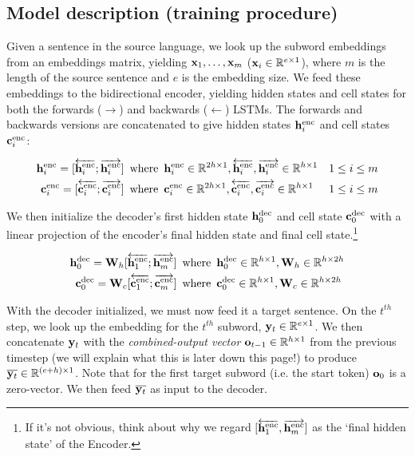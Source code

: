 \subsection*{Model description (training procedure)}
Given a sentence in the source language, we look up the subword embeddings from an embeddings matrix, yielding $\mathbf{x}_1, \dots, \mathbf{x}_m$ ($\mathbf{x}_i \in \mathbb{R}^{e \times 1}$), where $m$ is the length of the source sentence and $e$ is the embedding size. We feed these embeddings to the bidirectional encoder, yielding hidden states and cell states for both the forwards ($\rightarrow$) and backwards ($\leftarrow$) LSTMs. The forwards and backwards versions are concatenated to give hidden states $\mathbf{h}^{\text{enc}}_i$ and cell states $\mathbf{c}^{\text{enc}}_i$:

\begin{align}
    \mathbf{h}^{\text{enc}}_i = [\overleftarrow{\mathbf{h}^{\text{enc}}_{i}}; \overrightarrow{\mathbf{h}^{\text{enc}}_{i}}] \enspace &\text{where}\enspace \mathbf{h}^{\text{enc}}_i \in \mathbb{R}^{2h \times 1}, \overleftarrow{\mathbf{h}^{\text{enc}}_{i}}, \overrightarrow{\mathbf{h}^{\text{enc}}_{i}} \in \mathbb{R}^{h \times 1} &1 \le i \le m \\
    \mathbf{c}^{\text{enc}}_i = [\overleftarrow{\mathbf{c}^{\text{enc}}_{i}}; \overrightarrow{\mathbf{c}^{\text{enc}}_{i}}] \enspace &\text{where} \enspace \mathbf{c}^{\text{enc}}_i \in \mathbb{R}^{2h \times 1}, \overleftarrow{\mathbf{c}^{\text{enc}}_{i}}, \overrightarrow{\mathbf{c}^{\text{enc}}_{i}} \in \mathbb{R}^{h \times 1} &1 \le i \le m
\end{align}

We then initialize the decoder's first hidden state $\mathbf{h}^{\text{dec}}_0$ and cell state $\mathbf{c}^{\text{dec}}_0$ with a linear projection of the encoder's final hidden state and final cell state.\footnote{If it's not obvious, think about why we regard $[\overleftarrow{\mathbf{h}^{\text{enc}}_{1}}, \overrightarrow{\mathbf{h}^{\text{enc}}_{m}}]$ as the `final hidden state' of the Encoder.}

\begin{align}
    \mathbf{h}^{\text{dec}}_0 = \mathbf{W}_{h}[\overleftarrow{\mathbf{h}^{\text{enc}}_{1}}; \overrightarrow{\mathbf{h}^{\text{enc}}_{m}}] \enspace &\text{where} \enspace \mathbf{h}^{\text{dec}}_0 \in \mathbb{R}^{h \times 1}, \mathbf{W}_{h} \in \mathbb{R}^{h \times 2h}\\
    \mathbf{c}^{\text{dec}}_0 = \mathbf{W}_{c}[\overleftarrow{\mathbf{c}^{\text{enc}}_{1}}; \overrightarrow{\mathbf{c}^{\text{enc}}_{m}}] \enspace &\text{where} \enspace \mathbf{c}^{\text{dec}}_0 \in \mathbb{R}^{h \times 1}, \mathbf{W}_{c} \in \mathbb{R}^{h \times 2h}
\end{align}

With the decoder initialized, we must now feed it a target sentence. On the $t^{th}$ step, we look up the embedding for the $t^{th}$ subword,  $\mathbf{y}_t \in \mathbb{R}^{e \times 1}$. We then concatenate $\mathbf{y}_t$ with the \textit{combined-output vector} $\mathbf{o}_{t-1} \in \mathbb{R}^{h \times 1}$ from the previous timestep (we will explain what this is later down this page!\@) to produce $\overline{\mathbf{y}_t} \in \mathbb{R}^{(e+h) \times 1}$. Note that for the first target subword (i.e. the start token) $\mathbf{o}_{0}$ is a zero-vector. We then feed $\overline{\mathbf{y}_t}$ as input to the decoder.

